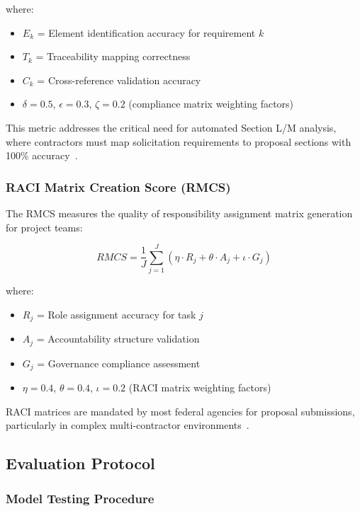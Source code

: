 \documentclass[11pt,a4paper]{article}
\begin{document}
where:
\begin{itemize}
    \item $E_k$ = Element identification accuracy for requirement $k$
    \item $T_k$ = Traceability mapping correctness
    \item $C_k$ = Cross-reference validation accuracy
    \item $\delta = 0.5$, $\epsilon = 0.3$, $\zeta = 0.2$ (compliance matrix weighting factors)
\end{itemize}

This metric addresses the critical need for automated Section L/M analysis, where contractors must map solicitation requirements to proposal sections with 100\% accuracy~\citep{gao2025procurement}.

\subsubsection{RACI Matrix Creation Score (RMCS)}

The RMCS measures the quality of responsibility assignment matrix generation for project teams:

\begin{equation}
RMCS = \frac{1}{J} \sum_{j=1}^{J} \left( \eta \cdot R_j + \theta \cdot A_j + \iota \cdot G_j \right)
\end{equation}

where:
\begin{itemize}
    \item $R_j$ = Role assignment accuracy for task $j$
    \item $A_j$ = Accountability structure validation
    \item $G_j$ = Governance compliance assessment
    \item $\eta = 0.4$, $\theta = 0.4$, $\iota = 0.2$ (RACI matrix weighting factors)
\end{itemize}

RACI matrices are mandated by most federal agencies for proposal submissions, particularly in complex multi-contractor environments~\citep{pmi2024standards, dod2025guidelines}.

\subsection{Evaluation Protocol}

\subsubsection{Model Testing Procedure}
\end{document}
